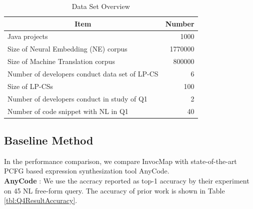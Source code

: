 \documentclass[sigconf,review,anonymous]{article}
\begin{document}
\begin{table}[]
\caption{Data Set Overview}
\label{tbl:datasetOverview}
\centering
\begin{tabular}{|l|r|}
\hline
\multicolumn{1}{|c|}{\textbf{Item}}                & \multicolumn{1}{c|}{\textbf{Number}} \\ \hline
Java projects                                      & 1000                                 \\ \hline
Size of Neural Embedding (NE) corpus               & 1770000                              \\ \hline
Size of Machine Translation corpus                 & 800000                                                               \\ \hline
Number of developers conduct data set of LP-CS        & 6                                    \\ \hline
Size of LP-CSs & 100                                  \\ \hline
Number of developers conduct in study of Q1        & 2                                    \\ \hline
Number of code snippet with NL in Q1               & 40                                   \\ \hline
\end{tabular}
\end{table}
\subsection{Baseline Method}
In the performance comparison, we compare InvocMap with state-of-the-art PCFG based expression synthesization tool AnyCode.
\\
\textbf{AnyCode} \cite{007}: We use the accracy reported as top-1 accuracy by their experiment on 45 NL free-form query. The accuracy of prior work is shown in Table \ref{tbl:Q4ResultAccuracy}. 
\end{document}
